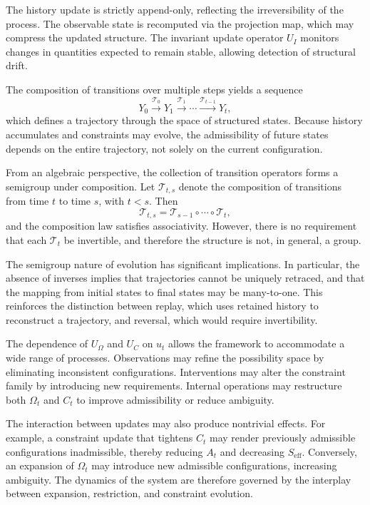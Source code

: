 \documentclass[11pt,oneside]{article}
\begin{document}
The history update is strictly append-only, reflecting the irreversibility of the process. The observable state is recomputed via the projection map, which may compress the updated structure. The invariant update operator \( U_I \) monitors changes in quantities expected to remain stable, allowing detection of structural drift.

The composition of transitions over multiple steps yields a sequence
\[
Y_0 \xrightarrow{\mathcal{T}_0} Y_1 \xrightarrow{\mathcal{T}_1} \cdots \xrightarrow{\mathcal{T}_{t-1}} Y_t,
\]
which defines a trajectory through the space of structured states. Because history accumulates and constraints may evolve, the admissibility of future states depends on the entire trajectory, not solely on the current configuration.

From an algebraic perspective, the collection of transition operators forms a semigroup under composition. Let \( \mathcal{T}_{t,s} \) denote the composition of transitions from time \( t \) to time \( s \), with \( t < s \). Then
\[
\mathcal{T}_{t,s} = \mathcal{T}_{s-1} \circ \cdots \circ \mathcal{T}_t,
\]
and the composition law satisfies associativity. However, there is no requirement that each \( \mathcal{T}_t \) be invertible, and therefore the structure is not, in general, a group.

The semigroup nature of evolution has significant implications. In particular, the absence of inverses implies that trajectories cannot be uniquely retraced, and that the mapping from initial states to final states may be many-to-one. This reinforces the distinction between replay, which uses retained history to reconstruct a trajectory, and reversal, which would require invertibility.

The dependence of \( U_{\Omega} \) and \( U_C \) on \( u_t \) allows the framework to accommodate a wide range of processes. Observations may refine the possibility space by eliminating inconsistent configurations. Interventions may alter the constraint family by introducing new requirements. Internal operations may restructure both \( \Omega_t \) and \( C_t \) to improve admissibility or reduce ambiguity.

The interaction between updates may also produce nontrivial effects. For example, a constraint update that tightens \( C_t \) may render previously admissible configurations inadmissible, thereby reducing \( A_t \) and decreasing \( S_{\mathrm{eff}} \). Conversely, an expansion of \( \Omega_t \) may introduce new admissible configurations, increasing ambiguity. The dynamics of the system are therefore governed by the interplay between expansion, restriction, and constraint evolution.
\end{document}
